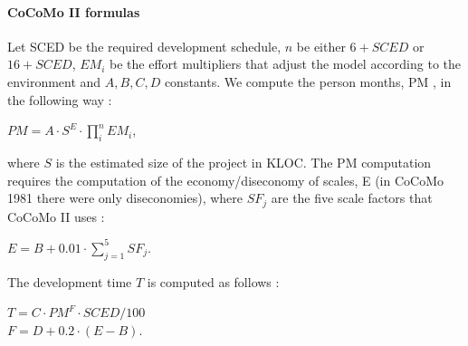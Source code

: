 \documentclass[11pt]{article}
\begin{document}
\paragraph{CoCoMo II formulas} Let SCED be the required development schedule, $n$ be either $6 + SCED$ or $16 + SCED$, $EM_i$ be the effort multipliers that adjust the model according to the environment and $A,B,C,D$ constants. We compute the person months, PM , in the following way :
\begin{center}
$PM = A \cdot S^E \cdot \prod_{i}^{n} EM_i$,
\end{center}
where $S$ is the estimated size of the project in KLOC. The PM computation requires the computation of the economy/diseconomy of scales, E (in CoCoMo 1981 there were only diseconomies), where $SF_j$ are the five scale factors that CoCoMo II uses :
\begin{center}
$E = B + 0.01 \cdot \sum_{j=1}^{5} SF_j$.
\end{center}
The development time $T$ is computed as follows : 
\begin{center}
$T = C \cdot PM^F \cdot SCED / 100$\\
$F = D + 0.2 \cdot (E - B)$.
\end{center}
\end{document}
